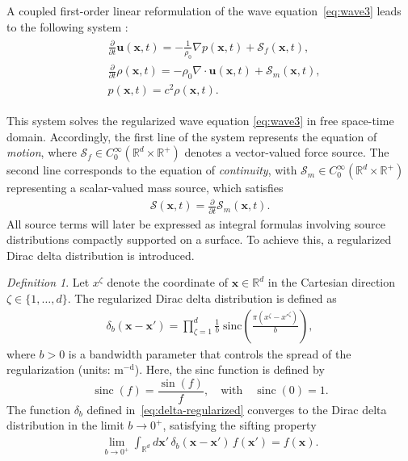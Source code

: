 \documentclass[11pt,reqno]{amsart}
\theoremstyle{remark}
\newtheorem{definition}{Definition}
\theoremstyle{italic_lemma}
\DeclareMathOperator{\sinc}{sinc}
\newcommand{\bx}{\boldsymbol{x}}
\newcommand{\bu}{\boldsymbol{u}}
\begin{document}
\noindent
A coupled first-order linear reformulation of the wave equation~\eqref{eq:wave3} leads to the following system \cite{Tabei}:
\begin{align}  
\label{eq:stepping3}
\begin{split}
    & \frac{\partial}{\partial t} \bu (\bx, t) = - \frac{1}{\rho_0} \nabla p(\bx, t) + \boldsymbol{\mathcal{S}}_f(\bx, t), \\
    & \frac{\partial}{\partial t} \rho(\bx,t) = - \rho_0 \nabla \cdot \bu (\bx, t) + \mathcal{S}_m(\bx, t), \\
    & p(\bx, t) = c^2 \rho(\bx,t).
\end{split}
\end{align}


This system solves the regularized wave equation \eqref{eq:wave3} in free space-time domain. Accordingly, the first line of the system represents the equation of \textit{motion}, where $\boldsymbol{\mathcal{S}}_f \in C_0^{\infty}( \mathbb{R}^d \times \mathbb{R}^+ )$ denotes a vector-valued force source. The second line corresponds to the equation of \textit{continuity}, with $\mathcal{S}_m \in C_0^{\infty}( \mathbb{R}^d \times \mathbb{R}^+ )$ representing a scalar-valued mass source, which satisfies
\begin{align} \label{eq:mass-source-regularized}
    \mathcal{S}(\bx, t) = \frac{\partial}{\partial t} \mathcal{S}_m(\bx, t).
\end{align}
\noindent
All source terms will later be expressed as integral formulas involving source distributions compactly supported on a surface. To achieve this, a regularized Dirac delta distribution is introduced.


\begin{definition} \label{def:1}
 Let $x^{\zeta}$ denote the coordinate of $\bx \in \mathbb{R}^d$ in the Cartesian direction $\zeta \in \{1,\dots,d\}$. The regularized Dirac delta distribution is defined as
\begin{align} \label{eq:delta-regularized}
\delta_b(\bx - \bx') 
= \prod_{\zeta=1}^d \frac{1}{b} \;
\mathrm{sinc}\!\left( \frac{\pi (x^\zeta - x'^\zeta)}{b} \right),
\end{align}
where $b > 0$ is a bandwidth parameter that controls the spread of the regularization (units: $\mathrm{m}^{-\mathrm{d}}$). Here, the sinc function is defined by
\[
\sinc(f) = \frac{\sin(f)}{f}, \quad \text{with} \quad \sinc(0) = 1.
\]
The function \( \delta_b \) defined in~\eqref{eq:delta-regularized} converges to the Dirac delta distribution in the limit \( b \to 0^+ \), satisfying the sifting property
\begin{align} \label{eq:sifting}
\lim_{b \to 0^+} \int_{\mathbb{R}^d} d\bx' \, \delta_b(\bx - \bx') \, f(\bx') = f(\bx).
\end{align}
\end{definition}
\end{document}
